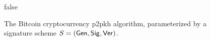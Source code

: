 \begin{figure}[t]
\begin{algorithm}[H]
    \caption{\label{alg.bitcoin} The Bitcoin cryptocurrency p2pkh algorithm,
    parameterized by a signature scheme $S = (\mathsf{Gen}, \mathsf{Sig}, \mathsf{Ver})$.}
    \begin{algorithmic}[1]
            \State{}
        \EndFunction
                \State\Return\textsf{false}
            \EndIf
            \State{}
        \EndFunction
        \vskip8pt
    \end{algorithmic}
\end{algorithm}
\end{figure}
